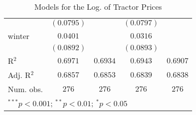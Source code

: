 \begin{table}
\begin{center}
\begin{tabular}{l c c c c}
            & $(0.0795)$      &                 & $(0.0797)$      &                 \\
winter      & $0.0401$        &                 & $0.0316$        &                 \\
            & $(0.0892)$      &                 & $(0.0893)$      &                 \\
\hline
R$^2$       & $0.6971$        & $0.6934$        & $0.6943$        & $0.6907$        \\
Adj. R$^2$  & $0.6857$        & $0.6853$        & $0.6839$        & $0.6838$        \\
Num. obs.   & $276$           & $276$           & $276$           & $276$           \\
\hline
\multicolumn{5}{l}{\scriptsize{$^{***}p<0.001$; $^{**}p<0.01$; $^{*}p<0.05$}}
\end{tabular}
\caption{Models for the Log. of Tractor Prices}
\label{tab:reg_reduction}
\end{center}
\end{table}
